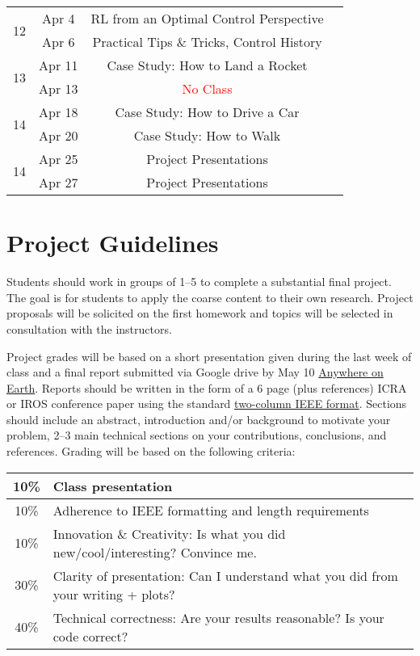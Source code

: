 \documentclass[11pt,letterpaper]{article}
\begin{document}
\begin{tabular}{c|c|c|c}
	 \hline
	\multirow{2}{*}{12}  & Apr 4 & RL from an Optimal Control Perspective &   \\
	 & Apr 6 & Practical Tips \& Tricks, Control History &   \\
	 \hline
	\multirow{2}{*}{13}  & Apr 11 & Case Study: How to Land a Rocket &  \\
	 & Apr 13 & \textcolor{red}{No Class} &   \\
	 \hline
	\multirow{2}{*}{14}  & Apr 18 & Case Study: How to Drive a Car &  \\
	 & Apr 20 & Case Study: How to Walk &   \\
	 \hline
	\multirow{2}{*}{14}  & Apr 25 & Project Presentations &  \\
	 & Apr 27 & Project Presentations &   \\
\end{tabular}

\clearpage

\section*{Project Guidelines}

Students should work in groups of 1--5 to complete a substantial final project. The goal is for students to apply the coarse content to their own research. Project proposals will be solicited on the first homework and topics will be selected in consultation with the instructors.

\medskip
\noindent
Project grades will be based on a short presentation given during the last week of class and a final report submitted via Google drive by May 10 \href{https://time.is/Anywhere_on_Earth}{Anywhere on Earth}. Reports should be written in the form of a 6 page (plus references) ICRA or IROS conference paper using the standard \href{https://www.ieee.org/conferences/publishing/templates.html}{two-column IEEE format}. Sections should include an abstract, introduction and/or background to motivate your problem, 2--3 main technical sections on your contributions, conclusions, and references. Grading will be based on the following criteria:
\newline
\newline
\begin{tabular}{|c|l|}
\hline
10\% & Class presentation \\
\hline
10\% & Adherence to IEEE formatting and length requirements \\
\hline
10\% & Innovation \& Creativity: Is what you did new/cool/interesting? Convince me. \\
\hline
30\% & Clarity of presentation: Can I understand what you did from your writing + plots? \\
\hline
40\% & Technical correctness: Are your results reasonable? Is your code correct? \\
\hline	
\end{tabular}
\end{document}
